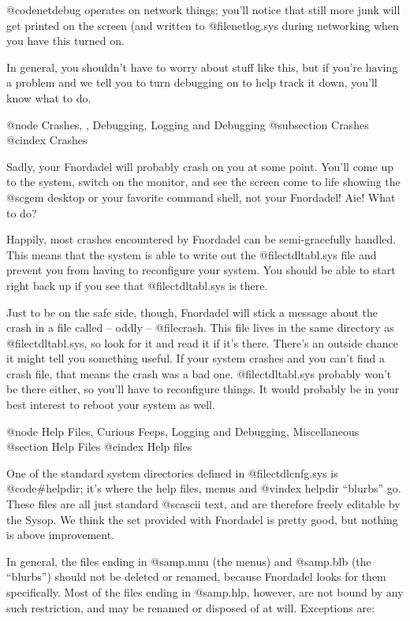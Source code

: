 @code{netdebug} operates on network things; you'll notice that
still more junk will get printed on the screen (and written to
@file{netlog.sys} during networking when you have this turned on.

In general, you shouldn't have to worry about stuff like
this, but if you're having a problem and we tell you to turn
debugging on to help track it down, you'll know what to do.

@node Crashes,  , Debugging, Logging and Debugging
@subsection Crashes
@cindex Crashes

Sadly, your Fnordadel will probably crash on you at
some point.  You'll come up to the system, switch on the monitor,
and see the screen come to life showing the @sc{gem} desktop or your
favorite command shell, not your Fnordadel!  Aie!  What to do?

Happily, most crashes encountered by Fnordadel can be
semi-gracefully handled.  This means that the system is able to
write out the @file{ctdltabl.sys} file and prevent you from having to
reconfigure your system.  You should be able to start right
back up if you see that @file{ctdltabl.sys} is there.

Just to be on the safe side, though, Fnordadel will
stick a message about the crash in a file called -- oddly --
@file{crash}.  This file lives in the same directory as @file{ctdltabl.sys},
so look for it and read it if it's there.  There's an outside
chance it might tell you something useful.  If your system
crashes and you can't find a crash file, that means the crash
was a bad one.  @file{ctdltabl.sys} probably won't be there either, so
you'll have to reconfigure things.  It would probably be in
your best interest to reboot your system as well.

@node Help Files, Curious Feeps, Logging and Debugging, Miscellaneous
@section Help Files
@cindex Help files

One of the standard system directories defined in @file{ctdlcnfg.sys} is
@code{#helpdir}; it's where the help files, menus and
@vindex helpdir
``blurbs'' go.  These files
are all just standard @sc{ascii} text, and are therefore freely editable by
the Sysop.  We think the set provided with Fnordadel is pretty good,
but nothing is above improvement.

In general, the files ending in @samp{.mnu} (the menus) and @samp{.blb} (the
``blurbs'') should not be deleted or renamed, because Fnordadel looks for
them specifically.  Most of the files ending in @samp{.hlp}, however, are not
bound by any such restriction, and may be renamed or disposed of at will.
Exceptions are:

